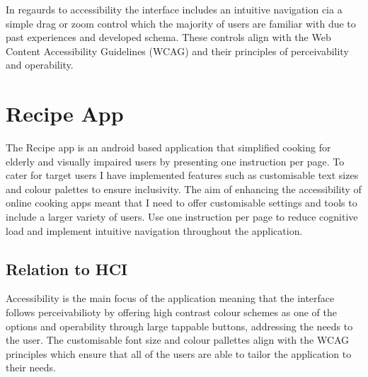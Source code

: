 \documentclass[]{project_interim}
\begin{document}
In regaurds to accessibility the interface includes an intuitive navigation cia a simple drag or zoom control which the majority of users are familiar with due to past experiences and developed schema. These controls align with the Web Content Accessibility Guidelines (WCAG) and their principles of perceivability and operability.\cite{initiative_wai_wcag_nodate}



\section{Recipe App}

The Recipe app is an android based application that simplified cooking for elderly and visually impaired users by presenting one instruction per page. To cater for target users I have implemented features such as customisable text sizes and colour palettes to ensure inclusivity.
The aim of enhancing the accessibility of online cooking apps meant that I need to offer customisable settings and tools to include a larger variety of users. Use one instruction per page to reduce cognitive load and implement intuitive navigation throughout the application.

\subsection{Relation to HCI}

Accessibility is the main focus of the application meaning that the interface follows perceivabilioty by offering high contrast colour schemes as one of the options and operability through large tappable buttons, addressing the needs to the user. The customisable font size and colour pallettes align with the WCAG principles which ensure that all of the users are able to tailor the application to their needs.
\end{document}
